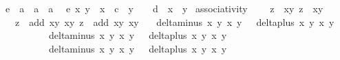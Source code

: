 \begin{isabellebody}
\isanewline
{}\isamarkupfalse%
\ e\ {\isacharcolon}{\isacharcolon}\ {\isachardoublequoteopen}{\isacharprime}a\ {\isasymRightarrow}\ {\isacharprime}a\ {\isasymRightarrow}\ {\isacharprime}a{\isachardoublequoteclose}\ \isanewline
\ {\isachardoublequoteopen}e\ x\ y\ {\isacharequal}\ x{\isacharcircum}{}\ {\isacharplus}\ c\ {\isacharasterisk}\ y{\isacharcircum}{}\ {\isacharminus}\ {}\ {\isacharminus}\ d\ {\isacharasterisk}\ x{\isacharcircum}{}\ {\isacharasterisk}\ y{\isacharcircum}{}{\isachardoublequoteclose}\isanewline
\isanewline
{}\isamarkupfalse%
\ associativity{\isacharcolon}\ \isanewline
\ \ \ {\isachardoublequoteopen}z{}{\isacharprime}\ {\isacharequal}\ {\isacharparenleft}x{}{\isacharprime}{\isacharcomma}y{}{\isacharprime}{\isacharparenright}{\isachardoublequoteclose}\ {\isachardoublequoteopen}z{}{\isacharprime}\ {\isacharequal}\ {\isacharparenleft}x{}{\isacharprime}{\isacharcomma}y{}{\isacharprime}{\isacharparenright}{\isachardoublequoteclose}\isanewline
\ \ \ {\isachardoublequoteopen}z{}{\isacharprime}\ {\isacharequal}\ add\ {\isacharparenleft}x{}{\isacharcomma}y{}{\isacharparenright}\ {\isacharparenleft}x{}{\isacharcomma}y{}{\isacharparenright}{\isachardoublequoteclose}\ {\isachardoublequoteopen}z{}{\isacharprime}\ {\isacharequal}\ add\ {\isacharparenleft}x{}{\isacharcomma}y{}{\isacharparenright}\ {\isacharparenleft}x{}{\isacharcomma}y{}{\isacharparenright}{\isachardoublequoteclose}\isanewline
\ \ \ {\isachardoublequoteopen}delta{\isacharunderscore}minus\ x{}\ y{}\ x{}\ y{}\ {\isasymnoteq}\ {}{\isachardoublequoteclose}\ {\isachardoublequoteopen}delta{\isacharunderscore}plus\ x{}\ y{}\ x{}\ y{}\ {\isasymnoteq}\ {}{\isachardoublequoteclose}\isanewline
\ \ \ \ \ \ \ \ \ \ {\isachardoublequoteopen}delta{\isacharunderscore}minus\ x{}\ y{}\ x{}\ y{}\ {\isasymnoteq}\ {}{\isachardoublequoteclose}\ {\isachardoublequoteopen}delta{\isacharunderscore}plus\ x{}\ y{}\ x{}\ y{}\ {\isasymnoteq}\ {}{\isachardoublequoteclose}\isanewline
\ \ \ \ \ \ \ \ \ \ {\isachardoublequoteopen}delta{\isacharunderscore}minus\ x{}{\isacharprime}\ y{}{\isacharprime}\ x{}\ y{}\ {\isasymnoteq}\ {}{\isachardoublequoteclose}\ {\isachardoublequoteopen}delta{\isacharunderscore}plus\ x{}{\isacharprime}\ y{}{\isacharprime}\ x{}\ y{}\ {\isasymnoteq}\ {}{\isachardoublequoteclose}\isanewline

\end{isabellebody}
